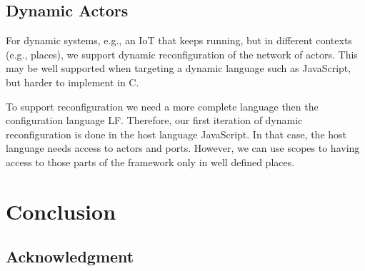 \documentclass[sigconf]{acmart}
\begin{document}
\subsection{Dynamic Actors}

For dynamic systems, e.g., an IoT that keeps running, but in different contexts
(e.g., places), we support dynamic reconfiguration of the network of actors.
This may be well supported when targeting a dynamic language such as JavaScript,
but harder to implement in C.

To support reconfiguration we need a more complete language then the configuration
language LF. Therefore, our first iteration of dynamic reconfiguration is done in the
host language JavaScript. In that case, the host language needs access to actors and
ports. However, we can use scopes to having access to those parts of the framework
only in well defined places.



\section{Conclusion}
\label{sec:conclusion}


\subsection*{Acknowledgment}



 
\end{document}
